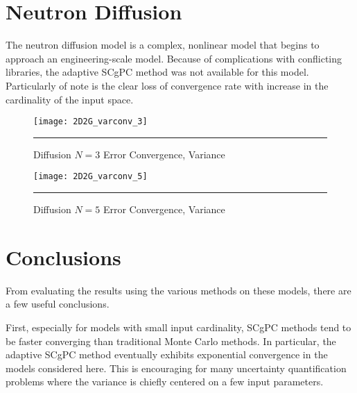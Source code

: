 \section{Neutron Diffusion}
The neutron diffusion model is a complex, nonlinear model that begins to approach an engineering-scale model.
Because of complications with conflicting libraries, the adaptive SCgPC method was not available for this
model.  Particularly of note is the clear loss of convergence rate with increase in the
cardinality of the input space. %

\begin{figure}[H]
  \centering
    \texttt{[image: 2D2G\_varconv\_3]}
    \rule{35em}{0.5pt}
  \caption{Diffusion $N=3$ Error Convergence, Variance}
  \label{fig:diff3_varconv}
\end{figure}
\begin{figure}[H]
  \centering
    \texttt{[image: 2D2G\_varconv\_5]}
    \rule{35em}{0.5pt}
  \caption{Diffusion $N=5$ Error Convergence, Variance}
  \label{fig:diff5_varconv}
\end{figure}





\section{Conclusions}
From evaluating the results using the various methods on these models, there are a few useful conclusions.

First, especially for models with small input cardinality, SCgPC methods tend to be faster converging than
traditional Monte Carlo methods.  In particular, the adaptive SCgPC method eventually exhibits exponential
convergence in the models considered here.  This is encouraging for many uncertainty quantification problems
where the variance is chiefly centered on a few input parameters.


